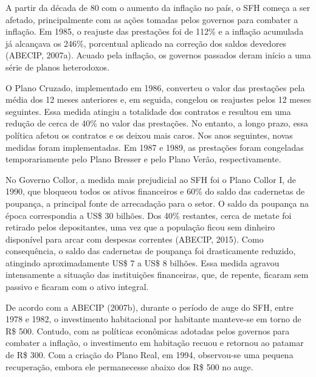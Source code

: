 \documentclass[
  12pt,
  a4paper,
]{scrreprt}
\begin{document}
\vspace{12pt}

A partir da década de 80 com o aumento da inflação no país, o SFH começa
a ser afetado, principalmente com as ações tomadas pelos governos para
combater a inflação. Em 1985, o reajuste das prestações foi de 112\% e a
inflação acumulada já alcançava os 246\%, porcentual aplicado na
correção dos saldos devedores (ABECIP, 2007a). Acuado pela inflação, os
governos passados deram início a uma série de planos heterodoxos.

\vspace{12pt}

O Plano Cruzado, implementado em 1986, converteu o valor das prestações
pela média dos 12 meses anteriores e, em seguida, congelou os reajustes
pelos 12 meses seguintes. Essa medida atingiu a totalidade dos contratos
e resultou em uma redução de cerca de 40\% no valor das prestações. No
entanto, a longo prazo, essa política afetou os contratos e os deixou
mais caros. Nos anos seguintes, novas medidas foram implementadas. Em
1987 e 1989, as prestações foram congeladas temporariamente pelo Plano
Bresser e pelo Plano Verão, respectivamente.

\vspace{12pt}

No Governo Collor, a medida mais prejudicial ao SFH foi o Plano Collor
I, de 1990, que bloqueou todos os ativos financeiros e 60\% do saldo das
cadernetas de poupança, a principal fonte de arrecadação para o setor. O
saldo da poupança na época correspondia a US\$ 30 bilhões. Dos 40\%
restantes, cerca de metate foi retirado pelos depositantes, uma vez que
a população ficou sem dinheiro disponível para arcar com despesas
correntes (ABECIP, 2015). Como consequência, o saldo das cadernetas de
poupança foi drasticamente reduzido, atingindo aproximadamente US\$ 7 a
US\$ 8 bilhões. Essa medida agravou intensamente a situação das
instituições financeiras, que, de repente, ficaram sem passivo e ficaram
com o ativo integral.

\vspace{12pt}

De acordo com a ABECIP (2007b), durante o período de auge do SFH, entre
1978 e 1982, o investimento habitacional por habitante manteve-se em
torno de R\$ 500. Contudo, com as políticas econômicas adotadas pelos
governos para combater a inflação, o investimento em habitação recuou e
retornou ao patamar de R\$ 300. Com a criação do Plano Real, em 1994,
observou-se uma pequena recuperação, embora ele permanecesse abaixo dos
R\$ 500 no auge.
\end{document}
